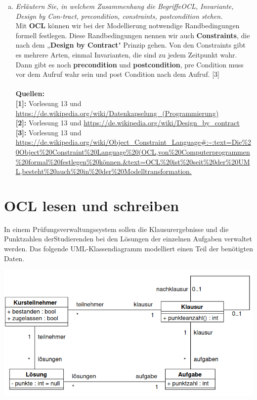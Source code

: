 \begin{enumerate}[(a)]
    \item {\itshape Erläutern Sie, in welchem Zusammenhang die BegriffeOCL, Invariante, Design by Con-tract, precondition, constraints, postcondition stehen.} \\
    Mit \textbf{OCL} können wir bei der Modellierung notwendige Randbedingungen formell festlegen. 
    Diese Randbedingungen nennen wir auch \textbf{Constraints}, die nach dem „\textbf{Design by Contract}" Prinzip gehen. Von den Constraints gibt es mehrere Arten, einmal Invarianten, die sind zu jedem Zeitpunkt wahr. Dann gibt es noch \textbf{precondition} und \textbf{postcondition}, pre Condition muss vor dem Aufruf wahr sein und post Condition nach dem Aufruf. [3] \\
    \\
    \textbf{Quellen:}\\
    \textbf{[1]:} Vorlesung 13 und \url{https://de.wikipedia.org/wiki/Datenkapselung_(Programmierung)} \\
    \textbf{[2]:} Vorlesung 13 und \url{https://de.wikipedia.org/wiki/Design_by_contract} \\
    \textbf{[3]:} Vorlesung 13 und \url{https://de.wikipedia.org/wiki/Object_Constraint_Language#:~:text=Die%20Object%20Constraint%20Language%20(OCL,von%20Computerprogrammen%20formal%20festlegen%20können.&text=OCL%20ist%20seit%20der%20UML,besteht%20auch%20in%20der%20Modelltransformation.} \\
    
\end{enumerate}

\section{OCL lesen und schreiben}
In einem Prüfungsverwaltungssystem sollen die Klausurergebnisse und die Punktzahlen derStudierenden bei den Lösungen der einzelnen Aufgaben verwaltet werden. Das folgende UML-Klassendiagramm modelliert einen Teil der benötigten Daten.

\includegraphics[width=1\textwidth]{src/u9/task2/uml.png}

